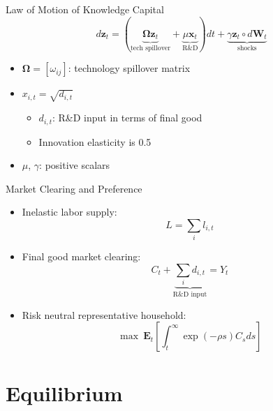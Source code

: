\documentclass[
  10pt,
  aspectratio=169,   %
]{beamer}
\theoremstyle{plain}
\begin{document}
\begin{frame}{Law of Motion of Knowledge Capital}
  \[
    d\bm{z}_{t}=\left(\underbrace{\bm{\Omega}\bm{z}_{t}}_{\text{tech spillover}}+\underbrace{\mu\bm{x}_{t}}_{\text{R\&D}}\right)dt+\underbrace{\gamma\bm{z}_{t} \circ d\bm{W}_{t}}_{\text{shocks}}
  \]
  \begin{itemize}
    \item $\bm{\Omega}=\left[\omega_{ij}\right]$: technology spillover matrix
    \medskip{}
    \item $x_{i,t}=\sqrt{d_{i,t}}$
    \begin{itemize}
      \item $d_{i,t}$: R\&D input in terms of final good
      \item Innovation elasticity is 0.5
      \medskip{}
    \end{itemize}
    \item $\mu$, $\gamma$: positive scalars
  \end{itemize}
\end{frame}

\begin{frame}{Market Clearing and Preference}
  \begin{itemize}
    \item Inelastic labor supply:
    \[
      L=\sum_{i}l_{i,t}
    \]
    \item Final good market clearing:
    \[
      C_{t}+\underbrace{\sum_{i}d_{i,t}}_{\text{R\&D input}}=Y_{t}
    \]
    \item Risk neutral representative household:
    \[
      \max\ \bm{E}_{t}\left[\int_{t}^{\infty}\exp\left(-\rho s\right)C_{s}ds\right]
    \]
  \end{itemize}
\end{frame}

\section{Equilibrium}
\end{document}
